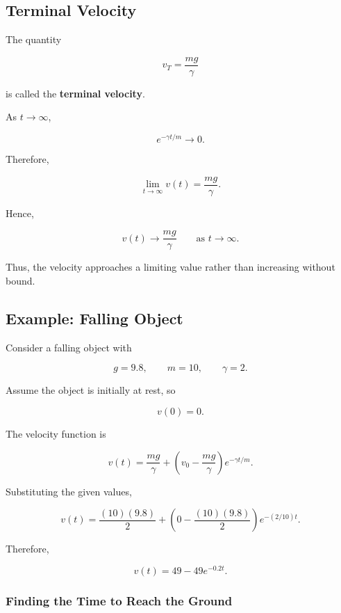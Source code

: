 \documentclass[11pt]{article}
\begin{document}
\subsection{Terminal Velocity}

The quantity

\[
\boxed{
v_T=\frac{mg}{\gamma}
}
\]

is called the \textbf{terminal velocity}.

As $t\to\infty$,

\[
e^{-\gamma t/m}\longrightarrow0.
\]

Therefore,

\[
\lim_{t\to\infty}v(t)
=
\frac{mg}{\gamma}.
\]

Hence,

\[
\boxed{
v(t)\longrightarrow\frac{mg}{\gamma}
\qquad\text{as }t\to\infty.
}
\]

Thus, the velocity approaches a limiting value rather than increasing
without bound.

\subsection{Example: Falling Object}

Consider a falling object with

\[
g=9.8,
\qquad
m=10,
\qquad
\gamma=2.
\]

Assume the object is initially at rest, so

\[
v(0)=0.
\]

The velocity function is

\[
v(t)
=
\frac{mg}{\gamma}
+
\left(
v_0-\frac{mg}{\gamma}
\right)e^{-\gamma t/m}.
\]

Substituting the given values,

\[
v(t)
=
\frac{(10)(9.8)}{2}
+
\left(
0-\frac{(10)(9.8)}{2}
\right)e^{-(2/10)t}.
\]

Therefore,

\[
\boxed{
v(t)=49-49e^{-0.2t}
}.
\]

\subsubsection{Finding the Time to Reach the Ground}
\end{document}
